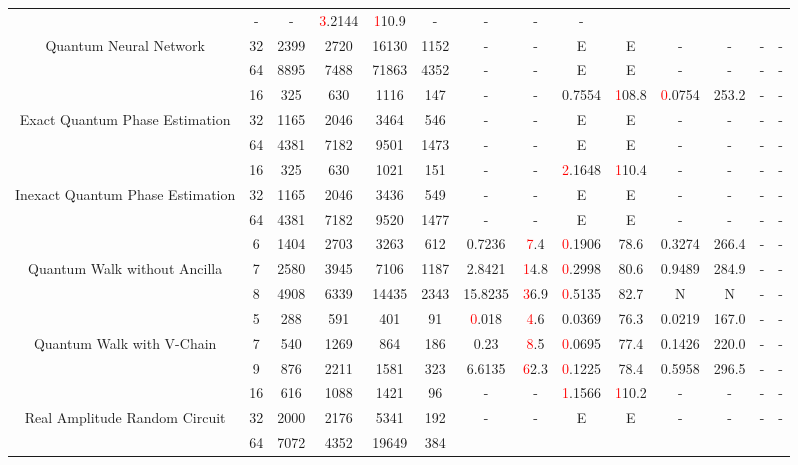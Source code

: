 \begin{table}[htb]
{\begin{tabular}{|c|c|c|c|c|c|c|c|c|c|c|c|c|c|}
 & - & -
 & \textcolor{red}3.2144 & \textcolor{red}110.9
 & - & -
 & - & -
 \\
Quantum Neural Network & 
32 & 2399 & 2720 & 16130 & 1152
 & - & -
 & E & E
 & - & -
 & - & -
 \\
 & 
64 & 8895 & 7488 & 71863 & 4352
 & - & -
 & E & E
 & - & -
 & - & -
 \\
\hline
 & 
16 & 325 & 630 & 1116 & 147
 & - & -
 & 0.7554 & \textcolor{red}108.8
 & \textcolor{red}0.0754 & 253.2
 & - & -
 \\
Exact Quantum Phase Estimation & 
32 & 1165 & 2046 & 3464 & 546
 & - & -
 & E & E
 & - & -
 & - & -
 \\
 & 
64 & 4381 & 7182 & 9501 & 1473
 & - & -
 & E & E
 & - & -
 & - & -
 \\
\hline
 & 
16 & 325 & 630 & 1021 & 151
 & - & -
 & \textcolor{red}2.1648 & \textcolor{red}110.4
 & - & -
 & - & -
 \\
Inexact Quantum Phase Estimation & 
32 & 1165 & 2046 & 3436 & 549
 & - & -
 & E & E
 & - & -
 & - & -
 \\
 & 
64 & 4381 & 7182 & 9520 & 1477
 & - & -
 & E & E
 & - & -
 & - & -
 \\
\hline
 & 
6 & 1404 & 2703 & 3263 & 612
 & 0.7236 & \textcolor{red}7.4
 & \textcolor{red}0.1906 & 78.6
 & 0.3274 & 266.4
 & - & -
 \\
Quantum Walk without Ancilla & 
7 & 2580 & 3945 & 7106 & 1187
 & 2.8421 & \textcolor{red}14.8
 & \textcolor{red}0.2998 & 80.6
 & 0.9489 & 284.9
 & - & -
 \\
 & 
8 & 4908 & 6339 & 14435 & 2343
 & 15.8235 & \textcolor{red}36.9
 & \textcolor{red}0.5135 & 82.7
 & N & N 
 & - & -
 \\
\hline
 & 
5 & 288 & 591 & 401 & 91
 & \textcolor{red}0.018 & \textcolor{red}4.6
 & 0.0369 & 76.3
 & 0.0219 & 167.0
 & - & -
 \\
Quantum Walk with V-Chain & 
7 & 540 & 1269 & 864 & 186
 & 0.23 & \textcolor{red}8.5
 & \textcolor{red}0.0695 & 77.4
 & 0.1426 & 220.0
 & - & -
 \\
 & 
9 & 876 & 2211 & 1581 & 323
 & 6.6135 & \textcolor{red}62.3
 & \textcolor{red}0.1225 & 78.4
 & 0.5958 & 296.5
 & - & -
 \\
\hline
 & 
16 & 616 & 1088 & 1421 & 96
 & - & -
 & \textcolor{red}1.1566 & \textcolor{red}110.2
 & - & -
 & - & -
 \\
Real Amplitude Random Circuit & 
32 & 2000 & 2176 & 5341 & 192
 & - & -
 & E & E
 & - & -
 & - & -
 \\
 & 
64 & 7072 & 4352 & 19649 & 384

\end{tabular}}
\end{table}
